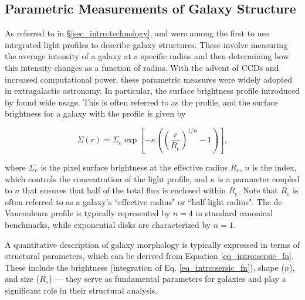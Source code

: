 \subsection{Parametric Measurements of Galaxy Structure} \label{sec_intro:parametric_measures}

As referred to in \S \ref{sec_intro:technology}, \citeauthor{de_vac_48} and \citeauthor{sersic_63} were among the first to use integrated light profiles to describe galaxy structures. These involve measuring the average intensity of a galaxy at a specific radius and then determining how this intensity changes as a function of radius. With the advent of CCDs and increased computational power, these parametric measures were widely adopted in extragalactic astronomy. In particular, the surface brightness profile introduced by \citet{sersic_63} found wide usage. This is often referred to as the \sersic{} profile, and the surface brightness for a galaxy with the profile is given by

\begin{equation}
\label{eq_intro:sersic_fn}
\Sigma(r) = \Sigma_e \exp \left[ -\kappa \left( \left( \frac{r}{R_e}\right)^{1/n} - 1 \right) \right] ,
\end{equation}

\noindent where $\Sigma_e$ is the pixel surface brightness at the effective radius $R_e$, $n$ is the \sersic{} index, which controls the concentration of the light profile, and $\kappa$ is a parameter coupled to $n$ that ensures that half of the total flux is enclosed within $R_e$. Note that $R_e$ is often referred to as a galaxy's ``effective radius" or ``half-light radius". The de Vaucouleurs profile is typically represented by $n = 4$ in standard canonical benchmarks, while exponential disks are characterized by $n = 1$. 

A quantitative description of galaxy morphology is typically expressed in terms of structural parameters, which can be derived from Equation \ref{eq_intro:sersic_fn}. These include the brightness (integration of Eq. \ref{eq_intro:sersic_fn}), shape ($n$), and size ($R_e$) --- they serve as fundamental parameters for galaxies and play a significant role in their structural analysis. 

